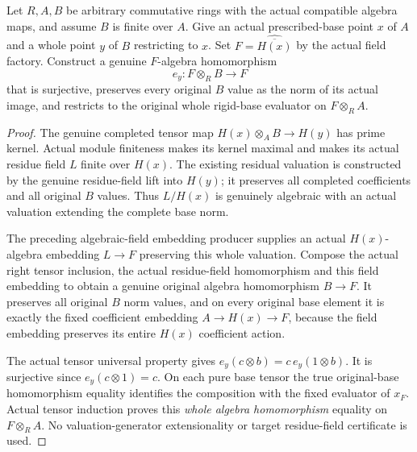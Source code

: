 \begin{definition}
\label{spectrum:finite-rigid-fibre-evaluation}
\leanok
{}
Let $R,A,B$ be arbitrary commutative rings with the actual compatible
algebra maps, and assume $B$ is finite over $A$. Give an actual
prescribed-base point $x$ of $A$ and a whole point $y$ of $B$ restricting
to $x$. Set $F=\widehat{\overline{H(x)}}$ by the actual field factory.
Construct a genuine $F$-algebra homomorphism
\[
 e_y:F\otimes_RB\longrightarrow F
\]
that is surjective, preserves every original $B$ value as the norm of its
actual image, and restricts to the original whole rigid-base evaluator
on $F\otimes_RA$.
\end{definition}
\begin{proof}
The genuine completed tensor map $H(x)\otimes_AB\to H(y)$ has prime
kernel. Actual module finiteness makes its kernel maximal and makes
its actual residue field $L$ finite over $H(x)$. The existing residual
valuation is constructed by the genuine residue-field lift into $H(y)$;
it preserves all completed coefficients and all original $B$ values.
Thus $L/H(x)$ is genuinely algebraic with an actual valuation extending
the complete base norm.

The preceding algebraic-field embedding producer supplies an actual
$H(x)$-algebra embedding $L\to F$ preserving this whole valuation.
Compose the actual right tensor inclusion, the actual residue-field
homomorphism and this field embedding to obtain a genuine original
algebra homomorphism $B\to F$. It preserves all original $B$ norm values,
and on every original base element it is exactly the fixed coefficient
embedding $A\to H(x)\to F$, because the field embedding preserves its
entire $H(x)$ coefficient action.

The actual tensor universal property gives $e_y(c\otimes b)=c\,e_y(1\otimes b)$.
It is surjective since $e_y(c\otimes1)=c$. On each pure base tensor the
true original-base homomorphism equality identifies the composition with
the fixed evaluator of $x_F$. Actual tensor induction proves this
\emph{whole algebra homomorphism} equality on $F\otimes_RA$.
No valuation-generator extensionality or target residue-field certificate
is used.
\end{proof}


